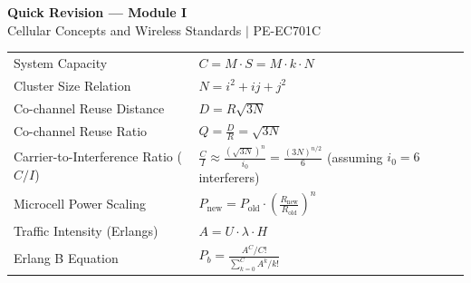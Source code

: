 \documentclass[12pt,a4paper]{article}
\renewcommand{\arraystretch}{1.45}
\begin{document}
\newpage
\begin{center}
  {\large\bfseries\color{myred} Quick Revision --- Module I}\\[3pt]
  {\small\color{mydark} Cellular Concepts and Wireless Standards $|$ PE-EC701C}
\end{center}
\noindent{\color{myred}\rule{\linewidth}{1.2pt}}
\vspace{4pt}

\begin{tcolorbox}[formulabox, title={\textbf{Key Formulas at a Glance}}]
\renewcommand{\arraystretch}{1.3}
\begin{tabularx}{\linewidth}{B{5.5cm} X}System Capacity & $C = M \cdot S = M \cdot k \cdot N$ \\
Cluster Size Relation & $N = i^2 + ij + j^2$ \\
Co-channel Reuse Distance & $D = R \sqrt{3N}$ \\
Co-channel Reuse Ratio & $Q = \frac{D}{R} = \sqrt{3N}$ \\
Carrier-to-Interference Ratio ($C/I$) & $\frac{C}{I} \approx \frac{(\sqrt{3N})^n}{i_0} = \frac{(3N)^{n/2}}{6}$ \quad (assuming $i_0 = 6$ interferers) \\
Microcell Power Scaling & $P_{\text{new}} = P_{\text{old}} \cdot \left(\frac{R_{\text{new}}}{R_{\text{old}}}\right)^n$ \\
Traffic Intensity (Erlangs) & $A = U \cdot \lambda \cdot H$ \\
Erlang B Equation & $P_b = \frac{A^C/C!}{\sum_{k=0}^{C} A^k/k!}$
\end{tabularx}
\end{tcolorbox}
\end{document}
